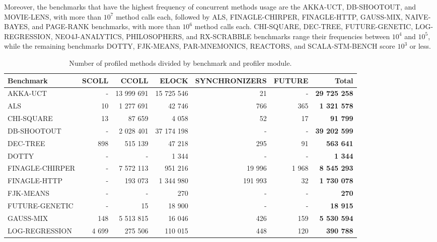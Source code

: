 \documentclass[]{usiinfthesis}
\begin{document}
Moreover, the benchmarks that have the highest frequency of concurrent methods usage are the AKKA-UCT, DB-SHOOTOUT, and MOVIE-LENS, with more than \(10^7\) method calls each, followed by ALS, FINAGLE-CHIRPER, FINAGLE-HTTP, GAUSS-MIX, NAIVE-BAYES, and PAGE-RANK benchmarks, with more than \(10^6\) method calls each. CHI-SQUARE, DEC-TREE, FUTURE-GENETIC, LOG-REGRESSION, NEO4J-ANALYTICS, PHILOSOPHERS, and RX-SCRABBLE benchmarks range their frequencies between \(10^4\) and \(10^5\), while the remaining benchmarks DOTTY, FJK-MEANS, PAR-MNEMONICS, REACTORS, and SCALA-STM-BENCH score \(10^3\) or less. 


\begin{table}
\centering
\caption[Method Usage Frequencies]{Number of profiled methods divided by benchmark and profiler module.}
\label{tab:2}
{\scriptsize
\begin{tabular}{|l|r|r|r|r|r||r|}
\hline
\textbf{Benchmark}	&	\textbf{SCOLL}	&	\textbf{CCOLL}	&	\textbf{ELOCK}	&	\textbf{SYNCHRONIZERS}	&	\textbf{FUTURE}	& \textbf{Total} \\ 
\hline
AKKA-UCT	&	 -   	&	 13 999 691 	&	 15 725 546 	&	 21 	&	 -   	& \textbf{	 29 725 258 	 }\\ 
ALS	&	 10 	&	 1 277 691 	&	 42 746 	&	 766 	&	 365 	& \textbf{	 1 321 578 	 }\\ 
CHI-SQUARE	&	 13 	&	 87 659 	&	 4 058 	&	 52 	&	 17 	& \textbf{	 91 799 	 }\\ 
DB-SHOOTOUT	&	 -   	&	 2 028 401 	&	 37 174 198 	&	 -   	&	 -   	& \textbf{	 39 202 599 	 }\\ 
DEC-TREE	&	 898 	&	 515 139 	&	 47 218 	&	 295 	&	 91 	& \textbf{	 563 641 	 }\\ 
DOTTY	&	 -   	&	 - 	&	 1 344 	&	 -   	&	 -   	& \textbf{	 1 344 	 }\\ 
FINAGLE-CHIRPER	&	 -   	&	 7 572 113 	&	 951 216 	&	 19 996 	&	 1 968 	& \textbf{	 8 545 293 	 }\\ 
FINAGLE-HTTP	&	 -   	&	 193 073 	&	 1 344 980 	&	 191 993 	&	 32 	& \textbf{	 1 730 078 	 }\\ 
FJK-MEANS	&	 -   	&	 - 	&	 270 	&	 -   	&	 -   	& \textbf{	 270 	 }\\ 
FUTURE-GENETIC	&	 -   	&	 15 	&	 18 900 	&	 -   	&	 -   	& \textbf{	 18 915 	 }\\ 
GAUSS-MIX	&	 148 	&	 5 513 815 	&	 16 046 	&	 426 	&	 159 	& \textbf{	 5 530 594 	 }\\ 
LOG-REGRESSION	&	 4 699 	&	 275 506 	&	 110 015 	&	 448 	&	 120 	& \textbf{	 390 788 	 }\\ 

\end{tabular}}
\end{table}
\end{document}
